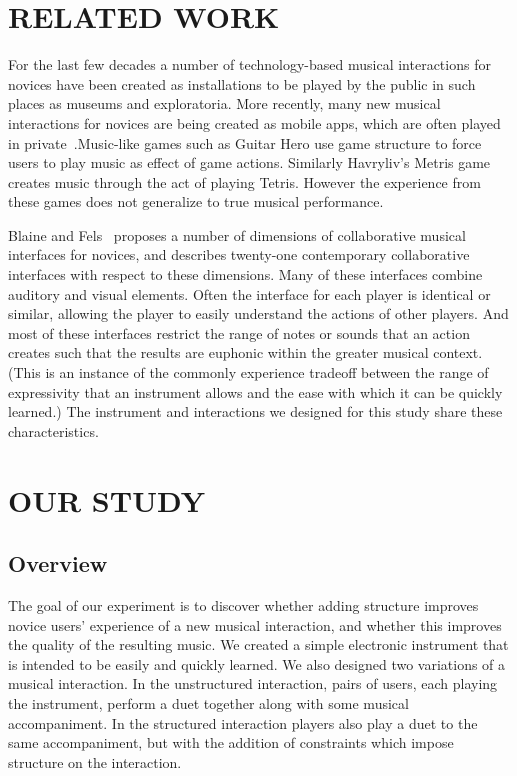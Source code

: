 \documentclass{article}
\begin{document}
\section{RELATED WORK}

For the last few decades a number of technology-based musical interactions for novices have been created as installations to be played by the public in such places as museums and exploratoria.  More recently, many new musical interactions for novices are being created as mobile apps, which are often played in private~\cite{smule,smule-2}.Music-like games such as Guitar Hero use game structure to force users to play music as effect of game actions.  Similarly Havryliv's Metris game~\cite{metris} creates music through the act of playing Tetris.  However the experience from these games does not generalize to true musical performance.

Blaine and Fels~\cite{survey} proposes a number of dimensions of collaborative musical interfaces for novices, and describes twenty-one contemporary collaborative interfaces with respect to these dimensions.  Many of these interfaces combine auditory and visual elements.  Often the interface for each player is identical or similar, allowing the player to easily understand the actions of other players. And most of these interfaces restrict the range of notes or sounds that an action creates such that the results are euphonic within the greater musical context.  (This is an instance of the commonly experience tradeoff between the range of expressivity that an instrument allows and the ease with which it can be quickly learned.)  The instrument and interactions we designed for this study share these characteristics.





\section{OUR STUDY}

\subsection{Overview}

The goal of our experiment is to discover whether adding structure improves novice users' experience of a new musical interaction, and whether this improves the quality of the resulting music.  We created a simple electronic instrument that is intended to be easily and quickly learned.  We also designed two variations of a musical interaction.  In the unstructured interaction, pairs of users, each playing the instrument, perform a duet together along with some musical accompaniment.  In the structured interaction players also play a duet to the same accompaniment, but with the addition of constraints which impose structure on the interaction.
\end{document}
